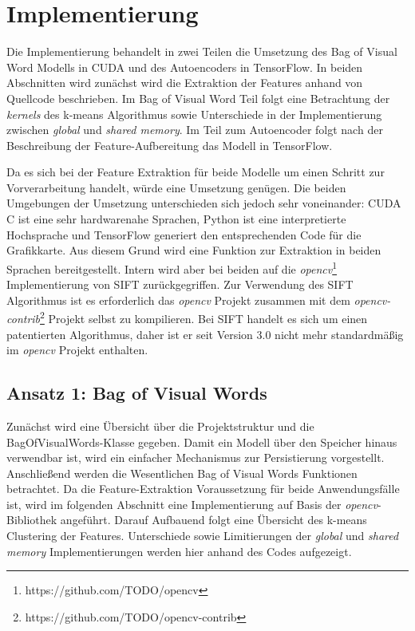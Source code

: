 \chapter{Implementierung}

Die Implementierung behandelt in zwei Teilen die Umsetzung des Bag of Visual Word Modells in CUDA und des Autoencoders in TensorFlow. In beiden Abschnitten wird zunächst wird die Extraktion der Features anhand von Quellcode beschrieben. Im Bag of Visual Word Teil folgt eine Betrachtung der \textit{kernels} des k-means Algorithmus sowie Unterschiede in der Implementierung zwischen \textit{global} und \textit{shared memory}. Im Teil zum Autoencoder folgt nach der Beschreibung der Feature-Aufbereitung das Modell in TensorFlow.

Da es sich bei der Feature Extraktion für beide Modelle um einen Schritt zur Vorverarbeitung handelt, würde eine Umsetzung genügen. Die beiden Umgebungen der Umsetzung unterschieden sich jedoch sehr voneinander: CUDA C ist eine sehr hardwarenahe Sprachen, Python ist eine interpretierte Hochsprache und TensorFlow generiert den entsprechenden Code für die Grafikkarte. Aus diesem Grund wird eine Funktion zur Extraktion in beiden Sprachen bereitgestellt. Intern wird aber bei beiden auf die \textit{opencv}\footnote{https://github.com/TODO/opencv} Implementierung von SIFT zurückgegriffen. Zur Verwendung des SIFT Algorithmus ist es erforderlich das \textit{opencv} Projekt zusammen mit dem \textit{opencv-contrib}\footnote{https://github.com/TODO/opencv-contrib} Projekt selbst zu kompilieren. Bei SIFT handelt es sich um einen patentierten Algorithmus, daher ist er seit Version 3.0 nicht mehr standardmäßig im \textit{opencv} Projekt enthalten.

\section{Ansatz 1: Bag of Visual Words}

Zunächst wird eine Übersicht über die Projektstruktur und die BagOfVisualWords-Klasse gegeben. Damit ein Modell über den Speicher hinaus verwendbar ist, wird ein einfacher Mechanismus zur Persistierung vorgestellt. Anschließend werden die Wesentlichen Bag of Visual Words Funktionen betrachtet. Da die Feature-Extraktion Voraussetzung für beide Anwendungsfälle ist, wird im folgenden Abschnitt eine Implementierung auf Basis der \textit{opencv}-Bibliothek angeführt. Darauf Aufbauend folgt eine Übersicht des k-means Clustering der Features. Unterschiede sowie Limitierungen der \textit{global} und \textit{shared memory} Implementierungen werden hier anhand des Codes aufgezeigt.

